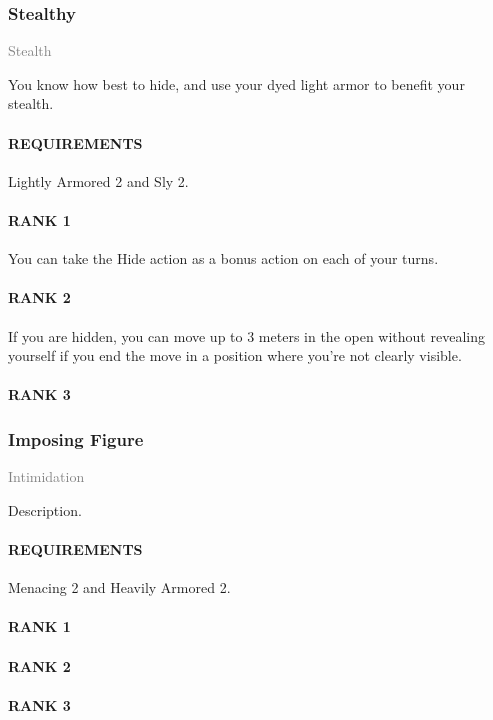 \subsubsection{Stealthy} \label{feat::stealthy}
\small{\textcolor{gray}{Stealth}}

\normalsize
You know how best to hide, and use your dyed light armor to benefit your stealth.
\paragraph{REQUIREMENTS} Lightly Armored 2 and Sly 2.
\paragraph{RANK 1} You can take the Hide action as a bonus action on each of your turns.
\paragraph{RANK 2} If you are hidden, you can move up to 3 meters in the open without revealing yourself if you end the move in a position where you're not clearly visible.
\paragraph{RANK 3}

\subsubsection{Imposing Figure} \label{feat::imposingfigure}
\small{\textcolor{gray}{Intimidation}}

\normalsize
Description.
\paragraph{REQUIREMENTS} Menacing 2 and Heavily Armored 2.
\paragraph{RANK 1}
\paragraph{RANK 2}
\paragraph{RANK 3}

